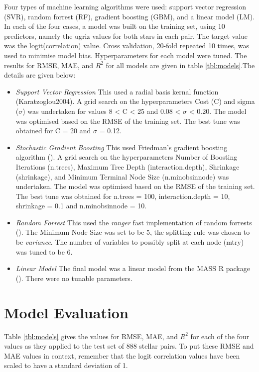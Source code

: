 \documentclass[preprint, 3p,
authoryear]{elsarticle} %
\begin{document}
Four types of machine learning algorithms were used: support vector
regression (SVR), random forrest (RF), gradient boosting (GBM), and a
linear model (LM). In each of the four cases, a model was built on the
training set, using 10 predictors, namely the ugriz values for both
stars in each pair. The target value was the logit(correlation) value.
Cross validation, 20-fold repeated 10 times, was used to minimise model
bias. Hyperparameters for each model were tuned. The results for RMSE,
MAE, and \(R^2\) for all models are given in table \ref{tbl:models}.The
details are given below:

\begin{itemize}
\item
  \emph{Support Vector Regression} This used a radial basis kernal
  function (Karatzoglou2004). A grid search on the hyperparameters Cost
  (C) and sigma (\(\sigma\)) was undertaken for values 8 \textless{} C
  \textless{} 25 and 0.08 \textless{} \(\sigma\) \textless{} 0.20. The
  model was optimised based on the RMSE of the training set. The best
  tune was obtained for C = 20 and \(\sigma\) = 0.12.
\item
  \emph{Stochastic Gradient Boosting} This used Friedman's gradient
  boosting algorithm (\citet{Boehmke2019}). A grid search on the
  hyperparameters Number of Boosting Iterations (n.trees), Maximum Tree
  Depth (interaction.depth), Shrinkage (shrinkage), and Minimum Terminal
  Node Size (n.minobsinnode) was undertaken. The model was optimised
  based on the RMSE of the training set. The best tune was obtained for
  n.trees = 100, interaction.depth = 10, shrinkage = 0.1 and
  n.minobsinnode = 10.
\item
  \emph{Random Forrest} This used the \emph{ranger} fast implementation
  of random forrests (\citet{Wright2017}). The Minimum Node Size was set
  to be 5, the splitting rule was chosen to be \emph{variance}. The
  number of variables to possibly split at each node (mtry) was tuned to
  be 6.
\item
  \emph{Linear Model} The final model was a linear model from the MASS R
  package (\citet{Venables2002}). There were no tunable parameters.
\end{itemize}

\hypertarget{model-evaluation}{%
\section{Model Evaluation}\label{model-evaluation}}

Table \ref{tbl:models} gives the values for RMSE, MAE, and \(R^2\) for
each of the four values as they applied to the test set of 888 stellar
pairs. To put these RMSE and MAE values in context, remember that the
logit correlation values have been scaled to have a standard deviation
of 1.
\end{document}
